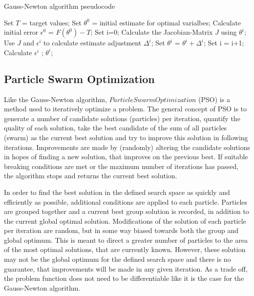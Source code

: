 \begin{algorithm}
	\caption{Gauss-Newton algorithm pseudocode}
	\begin{algorithmic}
		\State Set $T$ = target values;
		\State Set $\theta^{0}$ = initial estimate for optimal varialbes;
		\State Calculate initial error $\epsilon^0$ = $F(\theta^0) - T$;
		\State Set i=0;
			\State Calculate the Jacobian-Matrix $J$ using $\theta^i$;
			\State Use $J$ and $\epsilon^i$ to calculate estimate adjustment $\Delta^i$;
			\State Set $\theta^{i}$ = $\theta^{i} + \Delta^i$;
			\State Set i = i+1;
			\State Calculate $\epsilon^i$
		\EndWhile;
		\State {} $\theta^i$;
	\end{algorithmic}
\end{algorithm}



\subsection{Particle Swarm Optimization}
\label{sec:PSO}
Like the Gauss-Newton algorithm, $Particle Swarm Optimization$ (PSO) is a method used to iteratively optimize a problem. The general
concept of PSO is to generate a number of candidate solutions (particles) per iteration, quantify the quality of each solution, take the best
candidate of the sum of all particles (swarm) as the current best solution and try to improve this solution in following iterations.
Improvements are made by (randomly) altering the candidate solutions in hopes of finding a new solution, that improves on the previous best.
If suitable breaking conditions are met or the maximum number of iterations has passed, the algorithm stops and returns the current best solution.
\newline

In order to find the best solution in the defined search space as quickly and efficiently as possible, additional conditions are applied
to each particle. Particles are grouped together and a current best group solution is recorded, in addition to the current global optimal solution.
Modifications of the solution of each particle per iteration are random, but in some way biased towards both the group and global optimum.
This is meant to direct a greater number of particles to the area of the most optimal solutions, that are currently known.
However, these solution may not be the global optimum for the defined search space and there is no guarantee, that improvements will be made in any
given iteration. As a trade off, the problem function does not need to be differentiable like it is the case for the Gauss-Newton algorithm. \newline

